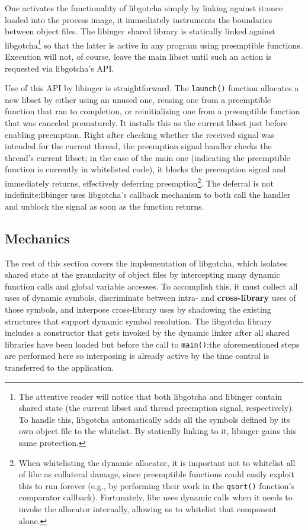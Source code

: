 One activates the functionality of libgotcha simply by linking against it:\@ once
loaded into the process image, it immediately instruments the boundaries between
object files.  The libinger shared library is statically linked against
libgotcha\footnote{The attentive reader will notice that both libgotcha and libinger
contain shared state (the current libset and thread preemption signal, respectively).
To handle this, libgotcha automatically adds all the symbols defined by its own
object file to the whitelist.  By statically linking to it, libinger gains this same
protection.} so that the latter is active in any program using preemptible functions.
Execution will not, of course, leave the main libset until such an action is
requested via libgotcha's API.

Use of this API by libinger is straightforward.  The \texttt{launch()} function
allocates a new libset by either using an unused one, reusing one from a preemptible
function that ran to completion, or reinitializing one from a preemptible function
that was canceled prematurely.  It installs
this as the current libset just before enabling preemption.  Right after checking
whether the received signal was intended for the current thread, the preemption
signal handler checks the thread's current libset; in the case of the main one
(indicating the preemptible function is currently in whitelisted code), it blocks the
preemption signal and immediately returns, effectively deferring
preemption\footnote{When whitelisting the dynamic allocator, it is important not to
whitelist all of libc as collateral damage, since preemptible functions could easily
exploit this to run forever (e.g., by performing their work in the \texttt{qsort()}
function's comparator callback).  Fortunately, libc uses dynamic calls when it needs
to invoke the allocator internally, allowing us to whitelist that component alone.}.
The deferral is not indefinite:\@ libinger uses libgotcha's callback mechanism to
both call the handler and unblock the signal as soon as the function returns.


\subsection{Mechanics}

The rest of this section covers the implementation of libgotcha, which isolates
shared state at the granularity of object files by intercepting many dynamic function
calls and global variable accesses.  To accomplish this, it must collect all uses of
dynamic symbols, discriminate between intra- and \textbf{cross-library} uses of those
symbols, and interpose cross-library uses by shadowing the existing structures that
support dynamic symbol resolution.  The libgotcha library includes a constructor that
gets invoked by the dynamic linker after all shared libraries have been loaded but
before the call to \texttt{main()}:\@ the aforementioned steps are performed here so
interposing is already active by the time control is transferred to the application.

